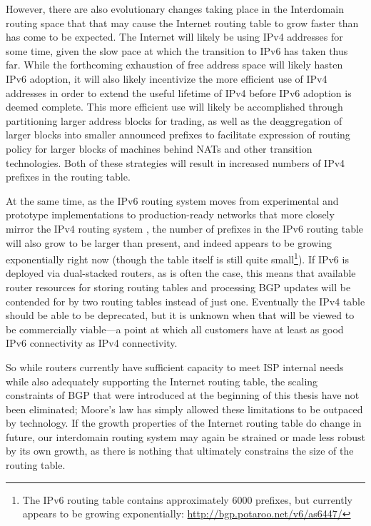 However, there are also evolutionary changes taking place in the Interdomain
routing space that that may cause the Internet routing table to grow faster
than has come to be expected. The Internet will likely be using IPv4 addresses
for some time, given the slow pace at which the transition to IPv6 has taken
thus far. While the forthcoming exhaustion of free address space will likely
hasten IPv6 adoption, it will also likely incentivize the more efficient use of
IPv4 addresses in order to extend the useful lifetime of IPv4 before IPv6
adoption is deemed complete. This more efficient use will likely be
accomplished through partitioning larger address blocks for trading, as well as
the deaggregation of larger blocks into smaller announced prefixes to facilitate
expression of routing policy for larger blocks of machines behind NATs and
other transition technologies. Both of these strategies will result in
increased numbers of IPv4 prefixes in the routing table.

At the same time, as the IPv6 routing system moves from experimental and
prototype implementations to production-ready networks that more closely mirror
the IPv4 routing system \cite{Cowie:2010vn}, the number of prefixes in the IPv6
routing table will also grow to be larger than present, and indeed appears to
be growing exponentially right now (though the table itself is still quite
small\footnote{The IPv6 routing table contains approximately 6000 prefixes, but
currently appears to be growing exponentially:
\url{http://bgp.potaroo.net/v6/as6447/}}). If IPv6 is deployed via
dual-stacked routers, as is often the case, this means that available router
resources for storing routing tables and processing BGP updates will be
contended for by two routing tables instead of just one. Eventually the IPv4
table should be able to be deprecated, but it is unknown when that will be
viewed to be commercially viable---a point at which all customers have at least
as good IPv6 connectivity as IPv4 connectivity.

So while routers currently have sufficient capacity to meet ISP internal needs
while also adequately supporting the Internet routing table, the scaling
constraints of BGP that were introduced at the beginning of this thesis have
not been eliminated; Moore's law has simply allowed these limitations to be
outpaced by technology. If the growth properties of the Internet routing table
do change in future, our interdomain routing system may again be strained or
made less robust by its own growth, as there is nothing that ultimately
constrains the size of the routing table.

